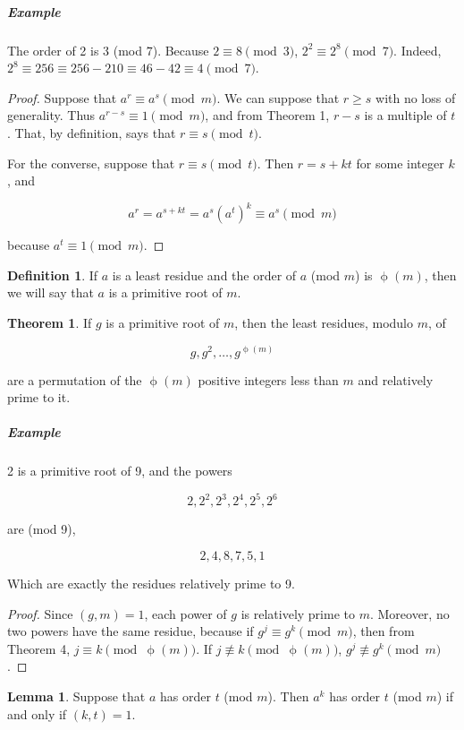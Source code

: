 \documentclass{article}
\theoremstyle{definition} %
\newtheorem{theorem}{Theorem}[section] %
\theoremstyle{definition}
\theoremstyle{definition}
\newtheorem{lemma}{Lemma}[section]
\newcommand{\tot}{\upphi}
\theoremstyle{definition}
\newtheorem{definition}{Definition}[section]
\begin{document}
  \subparagraph{Example} The order of 2 is 3 (mod $7$). Because $2 \equiv 8 \pmod{3}$, $2^2 \equiv 2^8 \pmod{7}$.
    Indeed, $2^8 \equiv 256 \equiv 256 - 210 \equiv 46 - 42 \equiv 4 \pmod{7}$.
  
  \begin{proof}
    Suppose that $a^r \equiv a^s \pmod{m}$. We can suppose that $r \geq s$ with no loss of generality.
    Thus $a^{r - s} \equiv 1 \pmod{m}$, and from Theorem 1, $r - s$ is a multiple of $t$. That, by definition,
    says that $r \equiv s \pmod{t}$.
    
    For the converse, suppose that $r \equiv s \pmod{t}$. Then $r = s + kt$ for some integer $k$, and
    
    \[ a^r = a^{s + kt} = a^s(a^t)^k \equiv a^s \pmod{m} \]
    
    because $a^t \equiv 1 \pmod{m}$.
  \end{proof}
  
  \begin{definition}
    If $a$ is a least residue and the order of $a$ (mod $m$) is $\tot(m)$, then we will say that $a$ is
    a primitive root of $m$.
  \end{definition}
  
  \begin{theorem}
    If $g$ is a primitive root of $m$, then the least residues, modulo $m$, of
    
    \[ g, g^2, \dots, g^{\tot(m)} \]
    
    are a permutation of the $\tot(m)$ positive integers less than $m$ and relatively prime to it.
  \end{theorem}
  
  \subparagraph{Example} 2 is a primitive root of 9, and the powers
  
  \[ 2, 2^2, 2^3, 2^4, 2^5, 2^6 \]
  
  are (mod 9),
  
  \[ 2, 4, 8, 7, 5, 1 \]
  
  Which are exactly the residues relatively prime to 9.
  
  \begin{proof}
    Since $(g, m) = 1$, each power of $g$ is relatively prime to $m$. Moreover, no two powers
    have the same residue, because if $g^j \equiv g^k \pmod{m}$, then from Theorem 4,
    $j \equiv k \pmod{\tot(m)}$. If $j \nequiv k \pmod{\tot(m)}$, $g^j \nequiv g^k \pmod{m}$.
  \end{proof}
  
  \begin{lemma}
    Suppose that $a$ has order $t$ (mod $m$). Then $a^k$ has order $t$ (mod $m$) if and
    only if $(k, t) = 1$.
  \end{lemma}
  
\end{document}
